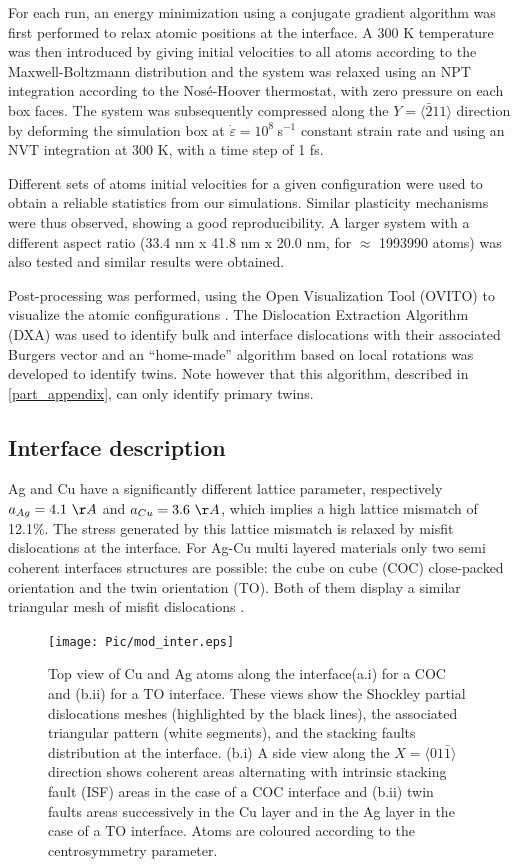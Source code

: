 \documentclass[final,3p,times,twocolumn]{elsarticle}
\begin{document}
For each run, an energy minimization using a conjugate gradient algorithm was first performed to relax atomic positions at the interface. A 300 K temperature was then introduced by giving initial velocities to all atoms according to the Maxwell-Boltzmann distribution and the system was relaxed using an NPT integration according to the Nosé-Hoover thermostat, with zero pressure on each box faces. The system was subsequently compressed along the $Y=\langle\bar{2}11\rangle$ direction by deforming the simulation box at $\dot{\varepsilon}=10^{8}~$s$^{-1}$ constant strain rate and using an NVT integration at 300 K, with a time step of 1 fs.

Different sets of atoms initial velocities for a given configuration were used to obtain a reliable statistics from our simulations. Similar plasticity mechanisms were thus observed, showing a good reproducibility. A larger system with a different aspect ratio (33.4 nm x 41.8 nm x 20.0 nm, for $\approx$ 1993990 atoms) was also tested and similar results were obtained. 

Post-processing was performed, using the Open Visualization Tool (OVITO) to visualize the atomic configurations \cite{stukowski10MSMSE1}. The Dislocation Extraction Algorithm (DXA) was used to identify bulk and interface dislocations with their associated Burgers vector and an ``home-made'' algorithm based on local rotations was developed to identify twins. Note however that this algorithm, described in \ref{part_appendix}, can only identify primary twins.

	\subsection{Interface description}
	\label{subpart_interface}
 
Ag and Cu have a significantly different lattice parameter, respectively $a_{Ag}=4.1~\AA$ and $a_{Cu}=3.6~\AA$, which implies a high lattice mismatch of 12.1\%. The stress generated by this lattice mismatch is relaxed by misfit dislocations at the interface. For Ag-Cu multi layered materials only two semi coherent interfaces structures are possible: the cube on cube (COC) close-packed orientation and the twin orientation (TO). Both of them display a similar triangular mesh of misfit dislocations \cite{wang11SM,an15APL}.
\begin{figure}[!h]
	\begin{center}
		\texttt{[image: Pic/mod\_inter.eps]} 
	\end{center}
	\caption{Top view of Cu and Ag atoms along the interface(a.i) for a COC and (b.ii) for a TO interface. These views show the Shockley partial dislocations meshes (highlighted by the black lines), the associated triangular pattern (white segments), and the stacking faults distribution at the interface. (b.i) A side view along the $X=\langle01\bar{1}\rangle$ direction shows coherent areas alternating with intrinsic stacking fault (ISF) areas in the case of a COC interface and (b.ii) twin faults areas successively in the Cu layer and in the Ag layer in the case of a TO interface. Atoms are coloured according to the centrosymmetry parameter.}\label{fig_mod_inter}
\end{figure}
\end{document}
